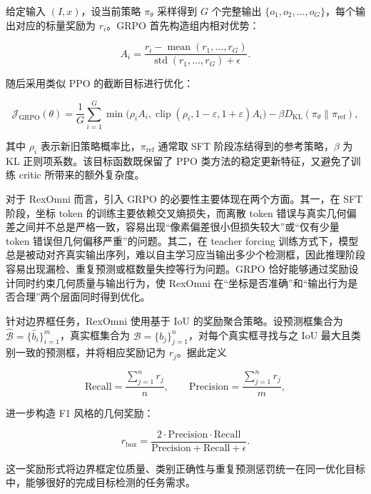 给定输入 $(I,x)$，设当前策略 $\pi_{\theta}$ 采样得到 $G$ 个完整输出 $\{o_1,o_2,\ldots,o_G\}$，每个输出对应的标量奖励为 $r_i$。GRPO 首先构造组内相对优势：

\begin{equation}
A_i=\frac{r_i-\operatorname{mean}(r_1,\ldots,r_G)}{\operatorname{std}(r_1,\ldots,r_G)+\epsilon}.
\end{equation}

随后采用类似 PPO\cite{schulman2017ppo} 的截断目标进行优化：

\begin{equation}
\mathcal{J}_{\text{GRPO}}(\theta)=\frac{1}{G}\sum_{i=1}^{G}\min\Big(\rho_iA_i,\operatorname{clip}(\rho_i,1-\varepsilon,1+\varepsilon)A_i\Big)-\beta D_{\mathrm{KL}}(\pi_{\theta}\|\pi_{\mathrm{ref}}),
\end{equation}

其中 $\rho_i$ 表示新旧策略概率比，$\pi_{\mathrm{ref}}$ 通常取 SFT 阶段冻结得到的参考策略，$\beta$ 为 KL 正则项系数。该目标函数既保留了 PPO 类方法的稳定更新特征，又避免了训练 critic 所带来的额外复杂度。

对于 RexOmni 而言，引入 GRPO 的必要性主要体现在两个方面。其一，在 SFT 阶段，坐标 token 的训练主要依赖交叉熵损失，而离散 token 错误与真实几何偏差之间并不总是严格一致，容易出现“像素偏差很小但损失较大”或“仅有少量 token 错误但几何偏移严重”的问题。其二，在 teacher forcing 训练方式下，模型总是被动对齐真实输出序列，难以自主学习应当输出多少个检测框，因此推理阶段容易出现漏检、重复预测或框数量失控等行为问题。GRPO 恰好能够通过奖励设计同时约束几何质量与输出行为，使 RexOmni 在“坐标是否准确”和“输出行为是否合理”两个层面同时得到优化。

针对边界框任务，RexOmni 使用基于 IoU 的奖励聚合策略。设预测框集合为 $\hat{\mathcal{B}}=\{\hat b_i\}_{i=1}^{m}$，真实框集合为 $\mathcal{B}=\{b_j\}_{j=1}^{n}$，对每个真实框寻找与之 IoU 最大且类别一致的预测框，并将相应奖励记为 $r_j$。据此定义

\begin{equation}
\mathrm{Recall}=\frac{\sum_{j=1}^{n} r_j}{n},\qquad
\mathrm{Precision}=\frac{\sum_{j=1}^{n} r_j}{m},
\end{equation}

进一步构造 F1 风格的几何奖励：

\begin{equation}
r_{\text{box}}=\frac{2\cdot \mathrm{Precision}\cdot \mathrm{Recall}}{\mathrm{Precision}+\mathrm{Recall}+\epsilon}.
\end{equation}

这一奖励形式将边界框定位质量、类别正确性与重复预测惩罚统一在同一优化目标中，能够很好的完成目标检测的任务需求。

